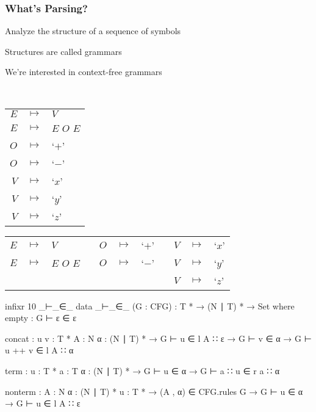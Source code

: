 \begin{frame}
	\frametitle{What's Parsing?}

	\begin{itemize*}
		\item Analyze the structure of a sequence of symbols
		\item Structures are called grammars
		\item We're interested in context-free grammars
	\end{itemize*}\\
	\vspace{0.5cm}
	\centering
	\begin{tabular}{rcl}
		$E$ & $ \mapsto $ & $V$ \\
		$E$ & $ \mapsto $ & $E$ $O$ $E$ \\
		$O$ & $ \mapsto $ & `$+$' \\
		$O$ & $ \mapsto $ & `$-$' \\
		$V$ & $ \mapsto $ & `$x$' \\
		$V$ & $ \mapsto $ & `$y$' \\
		$V$ & $ \mapsto $ & `$z$'
	\end{tabular}
\end{frame}

\begin{frame}
	\centering
	\begin{tabular}{rclcrclcrcl}
		$E$ & $ \mapsto $ & $V$         && $O$ & $ \mapsto $ & `$+$' && $V$ & $ \mapsto $ & `$x$' \\
		$E$ & $ \mapsto $ & $E$ $O$ $E$ && $O$ & $ \mapsto $ & `$-$' && $V$ & $ \mapsto $ & `$y$' \\
		    &             &             &&     &             &       && $V$ & $ \mapsto $ & `$z$'
	\end{tabular}
\end{frame}

\begin{frame}
	\begin{code}
		infixr 10 _⊢_∈_
		data _⊢_∈_ (G : CFG) :  T * → (N ∣ T) * → Set where
		  empty :
		    G ⊢ ε ∈ ε

		  concat : {u v : T *} {A : N} {α : (N ∣ T) *} →
		    G ⊢ u ∈ l A ∷ ε → G ⊢ v ∈ α → G ⊢ u ++ v ∈ l A ∷ α

		  term : {u : T *} {a : T} {α : (N ∣ T) *} →
		    G ⊢ u ∈ α → G ⊢ a ∷ u ∈ r a ∷ α

		  nonterm : {A : N} {α : (N ∣ T) *} {u : T *} →
		    (A , α) ∈ CFG.rules G → G ⊢ u ∈ α → G ⊢ u ∈ l A ∷ ε
	\end{code}
\end{frame}

